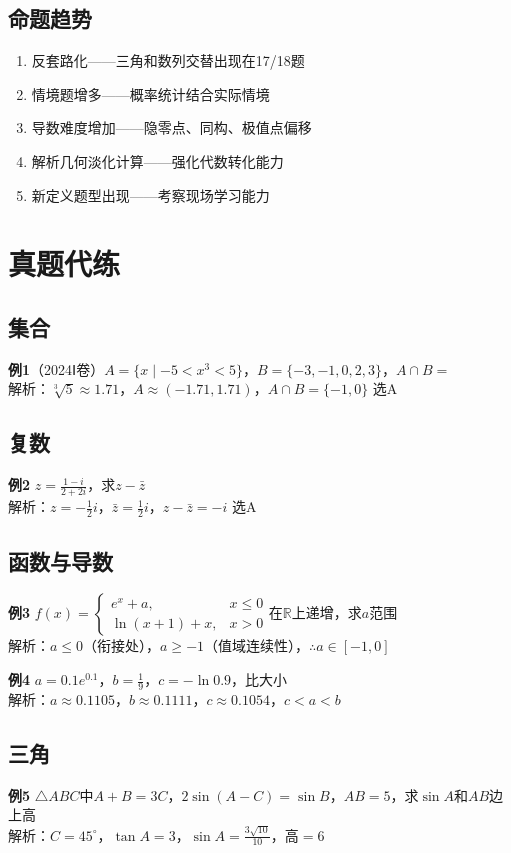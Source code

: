 \documentclass[12pt,a4paper]{ctexbook}
\begin{document}
\section{命题趋势}
\begin{enumerate}
  \item 反套路化——三角和数列交替出现在17/18题
  \item 情境题增多——概率统计结合实际情境
  \item 导数难度增加——隐零点、同构、极值点偏移
  \item 解析几何淡化计算——强化代数转化能力
  \item 新定义题型出现——考察现场学习能力
\end{enumerate}

\chapter{真题代练}

\section{集合}
\textbf{例1}（2024Ⅰ卷）$A=\{x\mid -5<x^3<5\}$，$B=\{-3,-1,0,2,3\}$，$A\cap B=$\\
解析：$\sqrt[3]{5}\approx1.71$，$A\approx(-1.71,1.71)$，$A\cap B=\{-1,0\}$ \quad 选A

\section{复数}
\textbf{例2} $z=\frac{1-i}{2+2i}$，求$z-\bar{z}$\\
解析：$z=-\frac12i$，$\bar{z}=\frac12i$，$z-\bar{z}=-i$ \quad 选A

\section{函数与导数}
\textbf{例3} $f(x)=\begin{cases}e^x+a,&x\le0\\ \ln(x+1)+x,&x>0\end{cases}$在$\mathbb{R}$上递增，求$a$范围\\
解析：$a\le0$（衔接处），$a\ge-1$（值域连续性），$\therefore a\in[-1,0]$

\textbf{例4} $a=0.1e^{0.1}$，$b=\frac19$，$c=-\ln0.9$，比大小\\
解析：$a\approx0.1105$，$b\approx0.1111$，$c\approx0.1054$，$c<a<b$

\section{三角}
\textbf{例5} $\triangle ABC$中$A+B=3C$，$2\sin(A-C)=\sin B$，$AB=5$，求$\sin A$和$AB$边上高\\
解析：$C=45^\circ$，$\tan A=3$，$\sin A=\frac{3\sqrt{10}}{10}$，高$=6$
\end{document}
